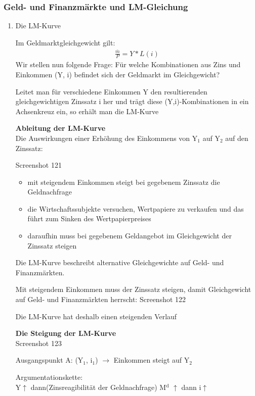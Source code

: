 \documentclass[11pt]{article}
\begin{document}
\subsubsection{Geld- und Finanzmärkte und LM-Gleichung}
\label{sec:orgb801ff2}
\begin{enumerate}
\item Die LM-Kurve
\label{sec:org7985d39}

Im Geldmarktgleichgewicht gilt:
\begin{equation*}
\begin{aligned}
\frac{\bar{m}}{P} = Y * L(i)
\end{aligned}
\end{equation*}
Wir stellen nun folgende Frage: Für welche Kombinationen aus Zins und Einkommen (Y, i) befindet sich der Geldmarkt im Gleichgewicht?

Leitet man für verschiedene Einkommen Y den resultierenden gleichgewichtigen Zinssatz i her und trägt diese (Y,i)-Kombinationen in ein Achsenkreuz ein, so erhält man die LM-Kurve

\textbf{Ableitung der LM-Kurve}\\
Die Auswirkungen einer Erhöhung des Einkommens von Y\(_{\text{1}}\) auf Y\(_{\text{2}}\) auf den Zinssatz:

Screenshot 121

\begin{itemize}
\item mit steigendem Einkommen steigt bei gegebenem Zinssatz die Geldnachfrage
\item die Wirtschaftssubjekte versuchen, Wertpapiere zu verkaufen und das führt zum Sinken des Wertpapierpreises
\item daraufhin muss bei gegebenem Geldangebot im Gleichgewicht der Zinssatz steigen
\end{itemize}

Die LM-Kurve beschreibt alternative Gleichgewichte auf Geld- und Finanzmärkten.

Mit steigendem Einkommen muss der Zinssatz steigen, damit Gleichgewicht auf Geld- und Finanzmärkten herrscht:
Screenshot 122

Die LM-Kurve hat deshalb einen steigenden Verlauf

\textbf{Die Steigung der LM-Kurve}\\
Screenshot 123

Ausgangspunkt A: (Y\(_{\text{1}}\), i\(_{\text{1}}\)) \(\rightarrow\) Einkommen steigt auf Y\(_{\text{2}}\) 

Argumentationskette:\\
Y\(\uparrow\) dann(Zinsreagibilität der Geldnachfrage) M\(^{\text{d}}\) \(\uparrow\) dann i\(\uparrow\)


\end{enumerate}
\end{document}

